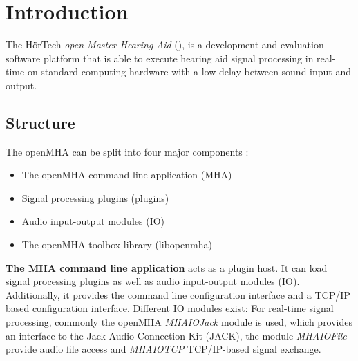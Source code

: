 
\section{Introduction}
The H\"{o}rTech \emph{open Master Hearing Aid} (\mha), is a development
and evaluation software platform that is able to execute hearing aid signal
processing in real-\/time on standard computing hardware with a low delay
between sound input and output.

\subsection{Structure}\label{index_str}
The openMHA can be split into four major components :
\begin{itemize}
\item The openMHA command line application (MHA)
\item Signal processing plugins (plugins)
\item Audio input-\/output modules (IO)
\item The openMHA toolbox library (libopenmha)
\end{itemize} 

{\bf The MHA command line application} acts as a plugin host. It can
load signal processing plugins as well as audio input-\/output modules
(IO). Additionally, it provides the command line configuration
interface and a TCP/IP based configuration interface. Different IO
modules exist: For real-\/time signal processing, commonly the openMHA
\emph{MHAIOJack} module is used, which provides an
interface to the Jack Audio Connection Kit (JACK), the module
\emph{MHAIOFile} provide audio file access and \emph{MHAIOTCP}
TCP/IP-\/based signal exchange.

